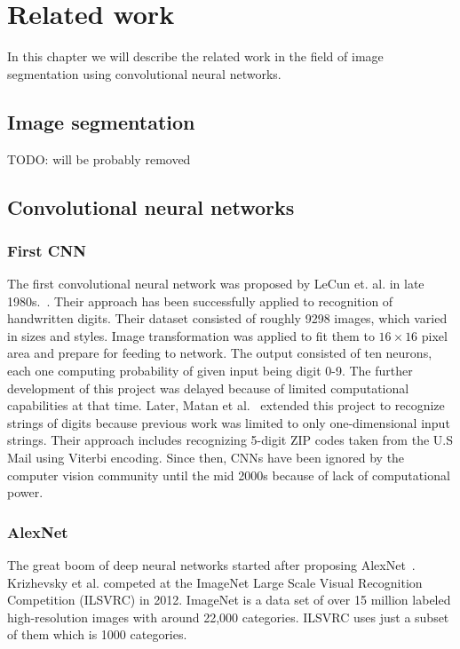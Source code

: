 \chapter{Related work}
\label{chapter:related_work}

In this chapter we will describe the related work in the field of image segmentation using
convolutional neural networks.

\section{Image segmentation}
\label{sec:rw_imgseg}

TODO: will be probably removed

\section{Convolutional neural networks}
\label{sec:cnn_rw}

\subsection{First CNN}
\label{sec:cnn_rw:lecun}

The first convolutional neural network was proposed by LeCun et.
al. in late 1980s.~\cite{bib:lecun1989backpropagation}. Their approach has been
successfully applied to recognition of handwritten digits. Their dataset consisted
of roughly 9298 images, which varied in sizes and styles. Image transformation
was applied to fit them to $16\times16$ pixel area and prepare for feeding to
network. The output consisted of ten neurons, each one computing probability
of given input being digit 0-9. The further development of this project was delayed
because of limited computational capabilities at that time.
Later, Matan et al.~\cite{bib:matan1992multi} extended this project to recognize
strings of digits because previous work was limited to only one-dimensional
input strings. Their approach includes recognizing 5-digit ZIP codes taken from
the U.S Mail using Viterbi encoding.
Since then, CNNs have been ignored by the computer vision community until the mid 2000s
because of lack of computational power.

\subsection{AlexNet}
\label{sec:cnn_rw:alexnet}

The great boom of deep neural networks started after proposing
AlexNet~\cite{bib:krizhevsky2012imagenet}. Krizhevsky et al. competed at the
ImageNet Large Scale Visual Recognition Competition (ILSVRC) in 2012. ImageNet
is a data set of over 15 million labeled high-resolution images with around 22,000
categories. ILSVRC uses just a subset of them which is 1000 categories.

